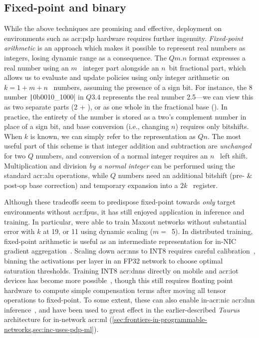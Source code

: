 \subsection{Fixed-point and binary}\label{sec:fixed-point-and-binary}
While the above techniques are promising and effective, deployment on environments such as \gls{acr:pdp} hardware requires further ingenuity.
\emph{Fixed-point arithmetic} is an approach which makes it possible to represent real numbers as integers, losing dynamic range as a consequence.
The $Qm.n$ format expresses a real number using an $m$~\unit{\bit} integer part alongside an $n$~\unit{bit} fractional part, which allows us to evaluate and update policies using only integer arithmetic on $k=1+m+n$~\unit{\bit} numbers, assuming the presence of a sign bit.
For instance, the \qty{8}{\bit} number \texttt|0b0010_1000| in $Q3.4$ represents the real number \num{2.5}---we can view this as two separate parts (2 + ), or as one whole in the fractional base ().
In practice, the entirety of the number is stored as a two's complement number in place of a sign bit, and base conversion (i.e., changing $n$) requires only bitshifts.
When $k$ is known, we can simply refer to the representation as $Qn$.
The most useful part of this scheme is that integer addition and subtraction are \emph{unchanged} for two $Q$ numbers, and conversion of a normal integer requires an $n$~\unit{\bit} left shift.
Multiplication and division \emph{by a normal integer} can be performed using the standard \gls{acr:alu} operations, while $Q$ numbers need an additional bitshift (pre- \& post-op base correction) and temporary expansion into a $2k$~\unit{\bit} register.

Although these tradeoffs seem to predispose fixed-point towards \emph{only} target environments without \glspl{acr:fpu}, it has still enjoyed application in inference and training.
In particular, \textcite{DBLP:journals/corr/CourbariauxBD14} were able to train Maxout networks without substantial error with $k$ at \qty{19}{\bit}, or \qty{11}{\bit} using dynamic scaling ($m=$~5).
In distributed training, fixed-point arithmetic is useful as an intermediate representation for in-NIC gradient aggregation~\parencite{DBLP:conf/nsdi/SapioC0NKKKMPR21,DBLP:conf/nsdi/LaoLMCWAS21}.
Scaling down \glspl{acr:nn} to INT8 requires careful calibration~\parencite{tensorrt-8bit}, binning the activations per layer in an FP32 network to choose optimal saturation thresholds.
Training INT8 \glspl{acr:dnn} directly on mobile and \gls{acr:iot} devices has become more possible~\parencite{DBLP:conf/usenix/Zhou0QGXZGLZ21}, though this still requires floating point hardware to compute simple compensation terms after moving all tensor operations to fixed-point.
To some extent, these can also enable in-\gls{acr:nic} \gls{acr:dnn} inference~\parencite{langlet-ml-netronome}, and have been used to great effect in the earlier-described \emph{Taurus}~\parencite{DBLP:journals/corr/abs-2002-08987,DBLP:conf/asplos/SwamyR0GO22} architecture for in-network \gls{acr:ml} (\cref{sec:frontiers-in-programmable-networks,sec:inc-uses-pdp-ml}).

